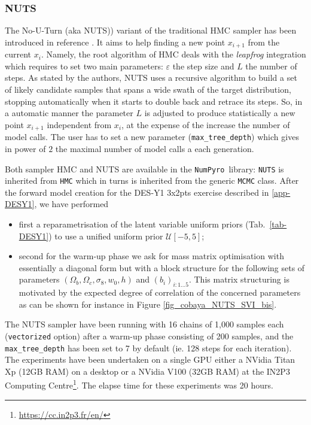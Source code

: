 \documentclass[final,5p,times,twocolumn,authoryear]{elsarticle}
\newcommand{\numpyro}{\texttt{NumPyro}}
\begin{document}
\subsubsection{NUTS}
\label{sec-NUTS}
%

The No-U-Turn (aka NUTS))  variant of the traditional HMC sampler has been introduced in reference \citep{nuts}. It aims to help finding a new point  $x_{i+1}$ from  the current $x_i$. Namely, the root algorithm of HMC deals with the \textit{leapfrog} integration which requires to set two main parameters: $\varepsilon$ the step size and $L$ the number of steps. As stated by the authors, NUTS  uses a recursive algorithm to build a set of likely candidate samples that spans a wide swath of the target distribution, stopping automatically when it starts to double back and retrace its steps. So, in a automatic manner the parameter $L$ is adjusted to produce statistically  a new point $x_{i+1}$ independent from $x_i$, at the expense of the increase the number of model calls. The user has to set a new  parameter  (\texttt{max\_tree\_depth}) which gives in power of $2$ the maximal number of model calls a each generation.

Both sampler HMC and NUTS are available in the \numpyro\ library: \texttt{NUTS} is inherited from \texttt{HMC} which in turns is inherited from the generic \texttt{MCMC} class.  After the forward model creation for the DES-Y1 3x2pts exercise described in \ref{app-DESY1}, we have performed 
\begin{itemize}
    \item first a reparametrisation of the latent variable uniform priors (Tab.~\ref{tab-DESY1}) to use a unified uniform prior $\mathcal{U}[-5,5]$;
    \item second for the warm-up phase we ask for mass matrix optimisation with essentially a diagonal form but with a block structure for the following sets of parameters $(\Omega_b,\Omega_c,\sigma_8,w_0,h)$ and $(b_i)_{i:1\dots5}$. This matrix structuring is motivated by the expected degree of correlation of the concerned parameters as can be shown for instance in Figure \ref{fig_cobaya_NUTS_SVI_bis}.
\end{itemize}
The NUTS sampler have been running with 16 chains of 1,000 samples each (\texttt{vectorized} option) after a warm-up phase consisting of 200 samples, and the \texttt{max\_tree\_depth} has been set to 7 by default (ie. 128 steps for each iteration). The experiments have been undertaken on a single GPU either a NVidia Titan Xp (12GB RAM) on a desktop or a NVidia V100 (32GB RAM) at the IN2P3 Computing Centre\footnote{\url{https://cc.in2p3.fr/en/}}. The elapse time for these experiments was 20 hours.
\end{document}
